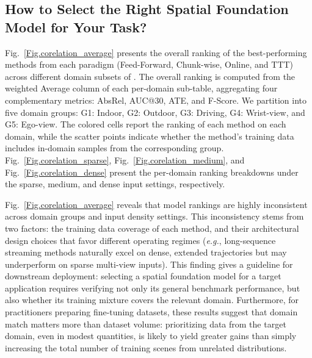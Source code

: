 \subsection{How to Select the Right Spatial Foundation Model for Your Task?}
%
Fig.~\ref{Fig.corelation_average} presents the overall ranking of the best-performing methods from each paradigm (Feed-Forward, Chunk-wise, Online, and TTT) across different domain subsets of \benchmark.
%
The overall ranking is computed from the weighted Average column of each per-domain sub-table, aggregating four complementary metrics: AbsRel, AUC@30, ATE, and F-Score.
%
We partition \benchmark into five domain groups: G1: Indoor, G2: Outdoor, G3: Driving, G4: Wrist-view, and G5: Ego-view.
%
The colored cells report the ranking of each method on each domain, while the scatter points indicate whether the method's training data includes in-domain samples from the corresponding group.
%
Fig.~\ref{Fig.corelation_sparse}, Fig.~\ref{Fig.corelation_medium}, and Fig.~\ref{Fig.corelation_dense} present the per-domain ranking breakdowns under the sparse, medium, and dense input settings, respectively.

Fig.~\ref{Fig.corelation_average} reveals that model rankings are highly 
inconsistent across domain groups and input density settings.
%
This inconsistency stems from two factors: the training data coverage of each method, and their architectural design choices that favor different operating regimes (\emph{e.g.}, long-sequence streaming methods naturally excel on dense, 
extended trajectories but may underperform on sparse multi-view inputs).
%
This finding gives a guideline for downstream deployment: selecting a spatial foundation model for a target application requires verifying not only its general benchmark performance, but also whether its training mixture covers the relevant domain.
%
Furthermore, for practitioners preparing fine-tuning datasets, these results suggest that domain match matters more than dataset volume: prioritizing data from the target domain, even in modest quantities, is likely to yield greater gains than simply increasing the total number of training scenes from unrelated distributions.
%
\clearpage
